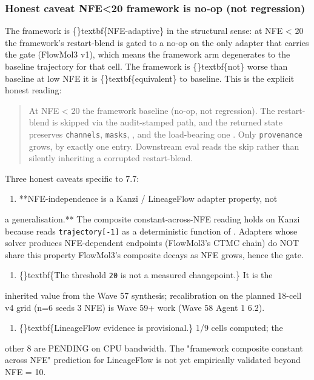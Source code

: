 \documentclass{article}
\begin{document}
\subsubsection{Honest caveat  NFE<20 framework is no-op (not regression)}
The framework is \{\}textbf\{NFE-adaptive\} in the structural sense: at NFE < 20 the framework's restart-blend is gated to a no-op on the only adapter that carries the gate (FlowMol3 v1), which means the framework arm degenerates to the baseline trajectory for that cell. The framework is \{\}textbf\{not\} worse than baseline at low NFE  it is \{\}textbf\{equivalent\} to baseline. This is the explicit honest reading:

\begin{quote}
At NFE < 20 the framework  baseline (no-op, not regression).
The restart-blend is skipped via the audit-stamped
 path,
and the returned state preserves \texttt{channels}, \texttt{masks}, ,
and  the load-bearing one  . Only \texttt{provenance}
grows, by exactly one entry. Downstream eval reads the skip rather
than silently inheriting a corrupted restart-blend.
\end{quote}
Three honest caveats specific to 7.7:

\begin{enumerate}
\item **NFE-independence is a Kanzi / LineageFlow adapter property, not
\end{enumerate}
a generalisation.** The composite constant-across-NFE reading holds on Kanzi because  reads \texttt{trajectory[-1]} as a deterministic function of . Adapters whose solver produces NFE-dependent endpoints (FlowMol3's CTMC chain) do NOT share this property  FlowMol3's composite decays as NFE grows, hence the gate.

\begin{enumerate}
\item \{\}textbf\{The threshold \texttt{20} is not a measured changepoint.\} It is the
\end{enumerate}
inherited value from the Wave 57 synthesis; recalibration on the planned 18-cell v4 grid (n=6 seeds  3 NFE) is Wave 59+ work (Wave 58 Agent 1 6.2).

\begin{enumerate}
\item \{\}textbf\{LineageFlow evidence is provisional.\} 1/9 cells computed; the
\end{enumerate}
other 8 are PENDING on CPU bandwidth. The "framework composite constant across NFE" prediction for LineageFlow is not yet empirically validated beyond NFE = 10.
\end{document}

